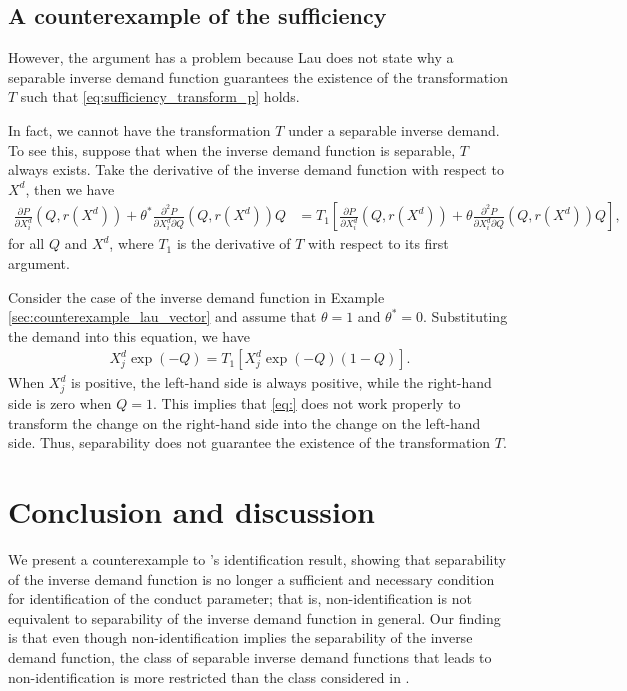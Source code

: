 \documentclass[11pt, a4paper]{article}
\theoremstyle{remark}
\begin{document}
\subsection{A counterexample of the sufficiency} \label{sec:counterexample_sufficiency}

However, the argument has a problem because Lau does not state why a separable inverse demand function guarantees the existence of the transformation $T$ such that \eqref{eq:sufficiency_transform_p} holds.

In fact, we cannot have the transformation $T$ under a separable inverse demand.
To see this, suppose that when the inverse demand function is separable, $T$ always exists.
Take the derivative of the inverse demand function with respect to $X^{d}$, then we have
\begin{align}
    \frac{\partial P}{\partial X^{d}_i}(Q, r(X^{d})) + \theta^{*} \frac{\partial^2 P}{\partial X^{d}_i\partial Q}(Q, r(X^{d}))Q 
    &= T_1\left[\frac{\partial P}{\partial X^{d}_i}(Q, r(X^{d})) + \theta \frac{\partial^2 P}{\partial X^{d}_i\partial Q}(Q, r(X^{d}))Q\right],
\end{align}
for all $Q$ and $X^{d}$, where $T_1$ is the derivative of $T$ with respect to its first argument.

Consider the case of the inverse demand function in Example \ref{sec:counterexample_lau_vector} and assume that $\theta = 1$ and $\theta^{*} = 0$.
Substituting the demand into this equation, we have
\begin{align}
X^{d}_j\exp(-Q) = T_1\left[X^{d}_j\exp(-Q)(1 - Q)\right].
\end{align}
When $X^{d}_j$ is positive, the left-hand side is always positive, while the right-hand side is zero when $Q = 1$.
This implies that \eqref{eq:} does not work properly to transform the change on the right-hand side into the change on the left-hand side.
Thus, separability does not guarantee the existence of the transformation $T$.


\section{Conclusion and discussion}

We present a counterexample to \citet{lau1982identifying}'s identification result, showing that separability of the inverse demand function is no longer a sufficient and necessary condition for identification of the conduct parameter; that is, non-identification is not equivalent to separability of the inverse demand function in general.
Our finding is that even though non-identification implies the separability of the inverse demand function, the class of separable inverse demand functions that leads to non-identification is more restricted than the class considered in \citet{lau1982identifying}.
\end{document}
